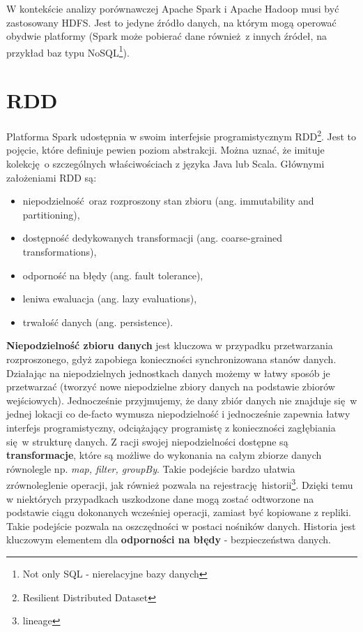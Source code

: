 \newline W kontekście analizy porównawczej Apache Spark i Apache Hadoop musi być zastosowany HDFS. Jest to jedyne źródło danych, na którym mogą operować obydwie platformy (Spark może pobierać dane również z innych źródeł, na przykład baz typu NoSQL\footnote{Not only SQL - nierelacyjne bazy danych}).

\section{RDD}\label{rdd-section}
Platforma Spark udostępnia w swoim interfejsie programistycznym RDD\footnote{Resilient Distributed Dataset}. Jest to pojęcie, które definiuje pewien poziom abstrakcji. Można uznać, że imituje kolekcję o szczególnych właściwościach z języka Java lub Scala. Głównymi założeniami RDD są\cite{Zaharia:2012:RDD:2228298.2228301}:
\begin{itemize}
	\item niepodzielność oraz rozproszony stan zbioru (ang. immutability and partitioning),
	\item dostępność dedykowanych transformacji (ang. coarse-grained transformations),
	\item odporność na błędy (ang. fault tolerance),
	\item leniwa ewaluacja (ang. lazy evaluations),
	\item trwałość danych (ang. persistence).	
\end{itemize}
\textbf{Niepodzielność zbioru danych} jest kluczowa w przypadku przetwarzania rozproszonego, gdyż zapobiega konieczności synchronizowana stanów danych. Działając na niepodzielnych jednostkach danych możemy w łatwy sposób je przetwarzać (tworzyć nowe niepodzielne zbiory danych na podstawie zbiorów wejściowych). Jednocześnie przyjmujemy, że dany zbiór danych nie znajduje się w jednej lokacji co de-facto wymusza niepodzielność i jednocześnie zapewnia łatwy interfejs programistyczny, odciążający programistę z konieczności zagłębiania się w strukturę danych. 
\newline Z racji swojej niepodzielności dostępne są \textbf{transformacje}, które są możliwe do wykonania na całym zbiorze danych równolegle np. \textit{map, filter, groupBy}. Takie podejście bardzo ułatwia zrównoleglenie operacji, jak również pozwala na rejestrację historii\footnote{lineage}. Dzięki temu w niektórych przypadkach uszkodzone dane mogą zostać odtworzone na podstawie ciągu dokonanych wcześniej operacji, zamiast być kopiowane z repliki. Takie podejście pozwala na oszczędności w postaci nośników danych. Historia jest kluczowym elementem dla \textbf{odporności na błędy} - bezpieczeństwa danych.
